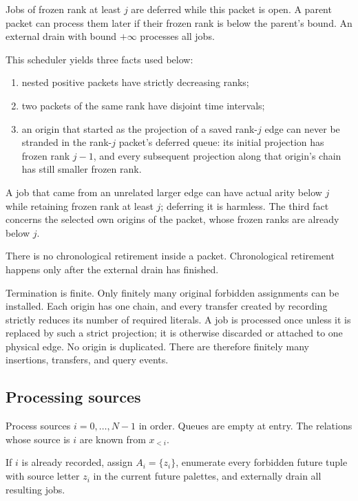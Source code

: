 Jobs of frozen rank at least \(j\) are deferred while this packet is open. A parent packet can process them later if their frozen rank is below the parent's bound. An external drain with bound \(+\infty\) processes all jobs.

This scheduler yields three facts used below:

\begin{enumerate}
\def\labelenumi{\arabic{enumi}.}
\tightlist
\item
  nested positive packets have strictly decreasing ranks;
\item
  two packets of the same rank have disjoint time intervals;
\item
  an origin that started as the projection of a saved rank-\(j\) edge can never be stranded in the rank-\(j\) packet's deferred queue: its initial projection has frozen rank \(j-1\), and every subsequent projection along that origin's chain has still smaller frozen rank.
\end{enumerate}

A job that came from an unrelated larger edge can have actual arity below \(j\) while retaining frozen rank at least \(j\); deferring it is harmless. The third fact concerns the selected own origins of the packet, whose frozen ranks are already below \(j\).

There is no chronological retirement inside a packet. Chronological retirement happens only after the external drain has finished.

Termination is finite. Only finitely many original forbidden assignments can be installed. Each origin has one chain, and every transfer created by recording strictly reduces its number of required literals. A job is processed once unless it is replaced by such a strict projection; it is otherwise discarded or attached to one physical edge. No origin is duplicated. There are therefore finitely many insertions, transfers, and query events.

\subsection{Processing sources}\label{processing-sources}

Process sources \(i=0,\ldots,N-1\) in order. Queues are empty at entry. The relations whose source is \(i\) are known from \(x_{<i}\).

If \(i\) is already recorded, assign \(A_i=\{z_i\}\), enumerate every forbidden future tuple with source letter \(z_i\) in the current future palettes, and externally drain all resulting jobs.

